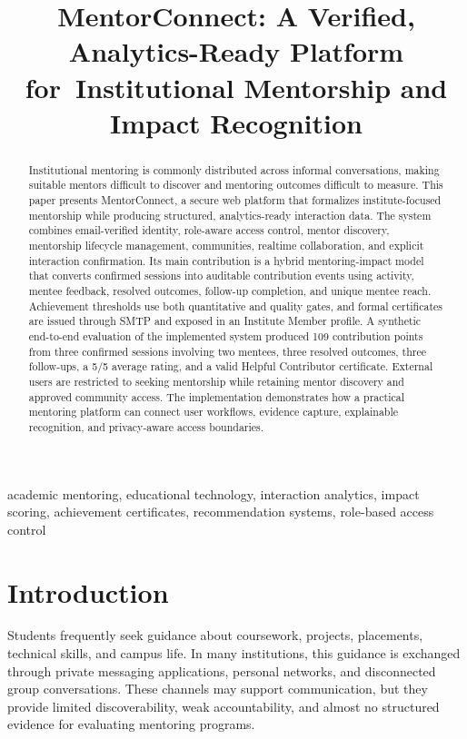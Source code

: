 \documentclass[conference]{IEEEtran}
\begin{document}
\title{MentorConnect: A Verified, Analytics-Ready Platform for\ Institutional Mentorship and Impact Recognition}

\author{}

\maketitle

\begin{abstract}
Institutional mentoring is commonly distributed across informal conversations, making suitable mentors difficult to discover and mentoring outcomes difficult to measure. This paper presents MentorConnect, a secure web platform that formalizes institute-focused mentorship while producing structured, analytics-ready interaction data. The system combines email-verified identity, role-aware access control, mentor discovery, mentorship lifecycle management, communities, realtime collaboration, and explicit interaction confirmation. Its main contribution is a hybrid mentoring-impact model that converts confirmed sessions into auditable contribution events using activity, mentee feedback, resolved outcomes, follow-up completion, and unique mentee reach. Achievement thresholds use both quantitative and quality gates, and formal certificates are issued through SMTP and exposed in an Institute Member profile. A synthetic end-to-end evaluation of the implemented system produced 109 contribution points from three confirmed sessions involving two mentees, three resolved outcomes, three follow-ups, a 5/5 average rating, and a valid Helpful Contributor certificate. External users are restricted to seeking mentorship while retaining mentor discovery and approved community access. The implementation demonstrates how a practical mentoring platform can connect user workflows, evidence capture, explainable recognition, and privacy-aware access boundaries.
\end{abstract}

\begin{IEEEkeywords}
academic mentoring, educational technology, interaction analytics, impact scoring, achievement certificates, recommendation systems, role-based access control
\end{IEEEkeywords}

\section{Introduction}
Students frequently seek guidance about coursework, projects, placements, technical skills, and campus life. In many institutions, this guidance is exchanged through private messaging applications, personal networks, and disconnected group conversations. These channels may support communication, but they provide limited discoverability, weak accountability, and almost no structured evidence for evaluating mentoring programs.
\end{document}
